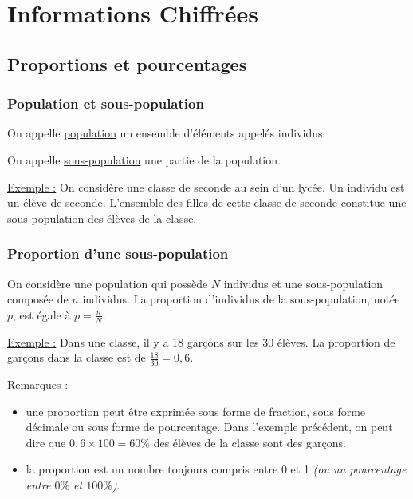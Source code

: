 \documentclass[french]{book}
\begin{document}
\pagestyle{empty}
\chapter*{Informations Chiffrées}

\section{Proportions et pourcentages}

    \subsection{Population et sous-population}

\begin{defn}
On appelle \underline{population} un ensemble d’éléments appelés individus.

On appelle \underline{sous-population} une partie de la population.
\end{defn}

\underline{Exemple :}  On considère une classe de seconde au sein d’un lycée. Un individu est un élève de seconde. L’ensemble des filles de cette classe de seconde constitue une sous-population des élèves de la classe.

   \subsection{Proportion d’une sous-population}

\begin{defn}
On considère une population qui possède $N$ individus et une sous-population composée de $n$ individus. La proportion d’individus de la sous-population, notée $p$, est égale à $p=\frac{n}{N}$.
\end{defn}

\underline{Exemple :}
Dans une classe, il y a 18 garçons sur les 30 élèves. La proportion de garçons dans la classe est de $\frac{18}{30}=0,6$.

\underline{Remarques :}

\begin{itemize}

\item[$\bullet$] une proportion peut être exprimée sous forme de fraction, sous forme décimale ou sous forme de pourcentage. Dans l’exemple précédent, on peut dire que $0,6 \times 100 = 60\%$ des élèves de la classe sont des garçons.

\item[$\bullet$] la proportion est un nombre toujours compris entre 0 et 1 \emph{(ou un pourcentage entre $0\%$ et $100\%$)}.
\end{itemize}
\end{document}
